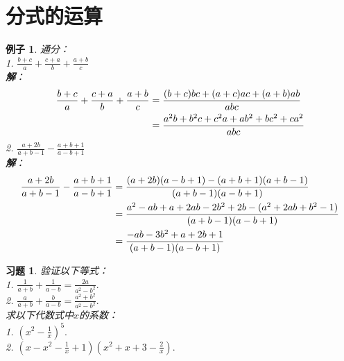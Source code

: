 \documentclass[12pt,UTF8]{ctexbook}
\newtheorem{ex}{例子}[section]
\newtheorem{xt}{习题}[section]
\begin{document}
\section{分式的运算}
\begin{ex}\label{ex:5-1-0}
    通分：\\
    1. $\frac{b+c}{a} + \frac{c+a}{b} + \frac{a+b}{c}$\\
    \textbf{解}：
    \begin{align}
        \frac{b+c}{a} + \frac{c+a}{b} + \frac{a+b}{c} &= \frac{(b+c)bc+(a+c)ac+(a+b)ab}{abc}\notag \\
        &= \frac{ a^2b+b^2c+c^2a + ab^2+bc^2+ca^2}{abc} \notag
    \end{align}
    2. $\frac{a+2b}{a+b-1} - \frac{a+b+1}{a-b+1}$\\
    \textbf{解}：
    \begin{align}
        \frac{a+2b}{a+b-1} - \frac{a+b+1}{a-b+1} &= \frac{(a+2b)(a-b+1) - (a+b+1)(a+b-1)}{(a+b-1)(a-b+1)}\notag \\
        &=  \frac{a^2-ab+a+2ab-2b^2+2b - (a^2+2ab+b^2-1)}{(a+b-1)(a-b+1)} \notag \\
        &= \frac{-ab-3b^2+a+2b+1}{(a+b-1)(a-b+1)} \notag
    \end{align}
\end{ex}

\begin{xt}\label{xt:5-1-0}
    验证以下等式：\\
    1. $\frac{1}{a+b} + \frac{1}{a-b} = \frac{2a}{a^2-b^2}.$\\
    2. $\frac{a}{a+b} + \frac{b}{a-b} = \frac{a^2+b^2}{a^2-b^2}.$\\
    求以下代数式中$x$的系数：\\
    1. $(x^2 - \frac{1}{x})^5.$\\
    2. $(x - x^2 - \frac{1}{x} + 1)(x^2 + x + 3 - \frac{2}{x}).$
\end{xt}
\end{document}
